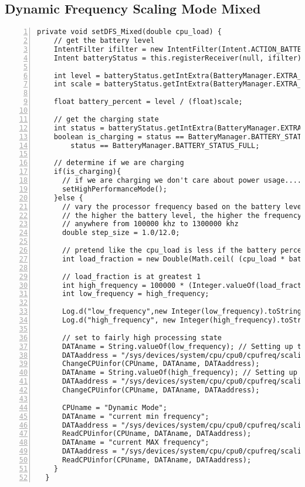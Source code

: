 \documentclass{article} %
\begin{document}
\subsection{Dynamic Frequency Scaling Mode Mixed}
\begin{lstlisting}[float=*,caption={Dynamic Frequency Scaling Mode Mixed},label={lst:DFS_mixed},numbers=left]
  private void setDFS_Mixed(double cpu_load) {
    // get the battery level
    IntentFilter ifilter = new IntentFilter(Intent.ACTION_BATTERY_CHANGED);
    Intent batteryStatus = this.registerReceiver(null, ifilter);

    int level = batteryStatus.getIntExtra(BatteryManager.EXTRA_LEVEL, -1);
    int scale = batteryStatus.getIntExtra(BatteryManager.EXTRA_SCALE, -1);

    float battery_percent = level / (float)scale;

    // get the charging state
    int status = batteryStatus.getIntExtra(BatteryManager.EXTRA_STATUS, -1);
    boolean is_charging = status == BatteryManager.BATTERY_STATUS_CHARGING ||
        status == BatteryManager.BATTERY_STATUS_FULL;

    // determine if we are charging
    if(is_charging){
      // if we are charging we don't care about power usage.... set to high performance mode
      setHighPerformanceMode();
    }else {
      // vary the processor frequency based on the battery level.
      // the higher the battery level, the higher the frequency.
      // anywhere from 100000 khz to 1300000 khz
      double step_size = 1.0/12.0;

      // pretend like the cpu_load is less if the battery percent is lower
      int load_fraction = new Double(Math.ceil( (cpu_load * battery_percent) / step_size)).intValue();

      // load_fraction is at greatest 1
      int high_frequency = 100000 * (Integer.valueOf(load_fraction) + 1);
      int low_frequency = high_frequency;

      Log.d("low_frequency",new Integer(low_frequency).toString());
      Log.d("high_frequency", new Integer(high_frequency).toString());

      // set to fairly high processing state
      DATAname = String.valueOf(low_frequency); // Setting up the minimum frequency at low frequency
      DATAaddress = "/sys/devices/system/cpu/cpu0/cpufreq/scaling_min_freq";
      ChangeCPUinfor(CPUname, DATAname, DATAaddress);
      DATAname = String.valueOf(high_frequency); // Setting up the maximum frequency at high frequency
      DATAaddress = "/sys/devices/system/cpu/cpu0/cpufreq/scaling_max_freq";
      ChangeCPUinfor(CPUname, DATAname, DATAaddress);

      CPUname = "Dynamic Mode";
      DATAname = "current min frequency";
      DATAaddress = "/sys/devices/system/cpu/cpu0/cpufreq/scaling_min_freq";
      ReadCPUinfor(CPUname, DATAname, DATAaddress);
      DATAname = "current MAX frequency";
      DATAaddress = "/sys/devices/system/cpu/cpu0/cpufreq/scaling_max_freq";
      ReadCPUinfor(CPUname, DATAname, DATAaddress);
    }
  }
\end{lstlisting}
\end{document}
